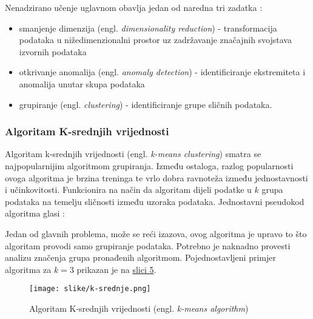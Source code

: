 \documentclass[]{foi} %
\begin{document}
Nenadzirano učenje uglavnom obavlja jedan od naredna tri zadatka \cite{nenadziranoZadaci}:
\begin{itemize}
 \item smanjenje dimenzija (engl. \textit{dimensionality reduction}) - transformacija podataka u nižedimenzionalni prostor uz zadržavanje značajnih svojstava izvornih podataka
 \item otkrivanje anomalija (engl. \textit{anomaly detection}) - identificiranje ekstremiteta i anomalija unutar skupa podataka
 \item grupiranje (engl. \textit{clustering}) - identificiranje grupe sličnih podataka.
\end{itemize}

\subsubsection{Algoritam K-srednjih vrijednosti}
Algoritam k-srednjih vrijednosti (engl. \textit{k-means clustering}) smatra se najpopularnijim algoritmom grupiranja. Između ostaloga, razlog popularnosti ovoga algoritma je brzina treninga te vrlo dobra ravnoteža između jednostavnosti i učinkovitosti. Funkcionira na način da algoritam dijeli podatke u $k$ grupa podataka na temelju sličnosti između uzoraka podataka. Jednostavni pseudokod algoritma glasi \cite[str. 78]{AIandGames}:


Jedan od glavnih problema, može se reći izazova, ovog algoritma je upravo to što algoritam provodi samo grupiranje podataka. Potrebno je naknadno provesti analizu značenja grupa pronađenih algoritmom. Pojednostavljeni primjer algoritma za $k = 3$ prikazan je na \hyperref[img: slika 5]{slici 5}.

\begin{figure}[H]
    \centering
    \texttt{[image: slike/k-srednje.png]}
    \caption{Algoritam K-srednjih vrijednosti (engl. \textit{k-means algorithm})}
\end{figure}
\label{img: slika 5}
\end{document}

